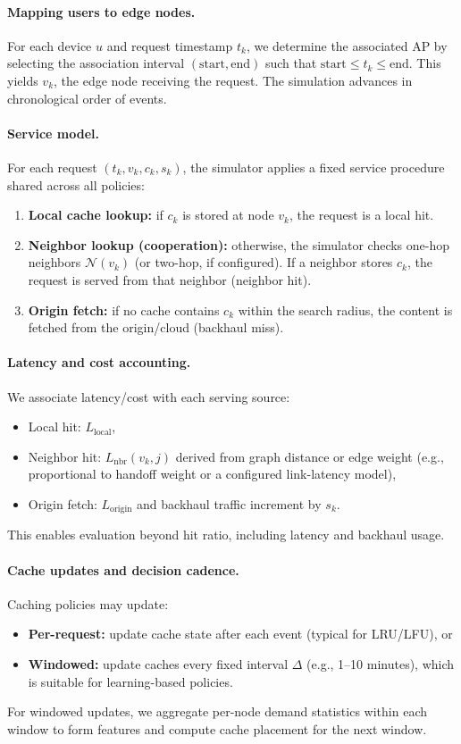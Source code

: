 \paragraph{Mapping users to edge nodes.}
For each device $u$ and request timestamp $t_k$, we determine the associated AP by selecting the association interval $(\text{start}, \text{end})$ such that $\text{start} \le t_k \le \text{end}$. This yields $v_k$, the edge node receiving the request. The simulation advances in chronological order of events.

\paragraph{Service model.}
For each request $(t_k, v_k, c_k, s_k)$, the simulator applies a fixed service procedure shared across all policies:
\begin{enumerate}
    \item \textbf{Local cache lookup:} if $c_k$ is stored at node $v_k$, the request is a local hit.
    \item \textbf{Neighbor lookup (cooperation):} otherwise, the simulator checks one-hop neighbors $\mathcal{N}(v_k)$ (or two-hop, if configured). If a neighbor stores $c_k$, the request is served from that neighbor (neighbor hit).
    \item \textbf{Origin fetch:} if no cache contains $c_k$ within the search radius, the content is fetched from the origin/cloud (backhaul miss).
\end{enumerate}

\paragraph{Latency and cost accounting.}
We associate latency/cost with each serving source:
\begin{itemize}
    \item Local hit: $L_{\text{local}}$,
    \item Neighbor hit: $L_{\text{nbr}}(v_k,j)$ derived from graph distance or edge weight (e.g., proportional to handoff weight or a configured link-latency model),
    \item Origin fetch: $L_{\text{origin}}$ and backhaul traffic increment by $s_k$.
\end{itemize}
This enables evaluation beyond hit ratio, including latency and backhaul usage.

\paragraph{Cache updates and decision cadence.}
Caching policies may update:
\begin{itemize}
    \item \textbf{Per-request:} update cache state after each event (typical for LRU/LFU), or
    \item \textbf{Windowed:} update caches every fixed interval $\Delta$ (e.g., 1--10 minutes), which is suitable for learning-based policies.
\end{itemize}
For windowed updates, we aggregate per-node demand statistics within each window to form features and compute cache placement for the next window.

